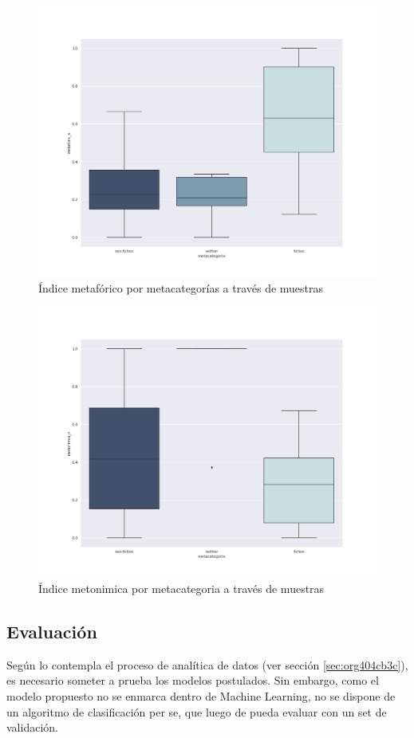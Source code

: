 \documentclass[12pt,letterpaper,twoside]{article}
\begin{document}
\begin{figure}[H]
\centering
\includegraphics[width=0.9\linewidth]{./resultados/graphs/total/metafora_total.png}
\caption{\label{fig:metafora_total} Índice metafórico por metacategorías a través de muestras }
\end{figure}

\begin{figure}[H]
\centering
\includegraphics[width=0.9\linewidth]{./resultados/graphs/total/metonimia_total.png}
\caption{\label{fig:metonimia_total} Índice metonimica por metacategoria a través de muestras }
\end{figure}

\subsection{Evaluación}
\label{sec:org2e8f3fe}
Según lo contempla el proceso de analítica de datos (ver sección \ref{sec:org404cb3c}),
es necesario someter a prueba los modelos postulados. Sin embargo, como el modelo propuesto
no se enmarca dentro de Machine Learning, no se dispone de un algoritmo de clasificación
per se, que luego de pueda evaluar con un set de validación.
\end{document}
